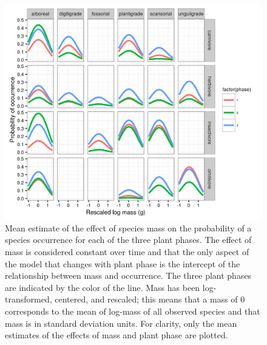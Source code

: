 \begin{figure}[ht]
  \centering
  \includegraphics[width=\textwidth,height=0.4\textheight,keepaspectratio=true]{chapter_coping/figure/mass_on_pres}
  \caption[Effect of mass on probability of species occurrence as estimated from the pure-presence model]{Mean estimate of the effect of species mass on the probability of a species occurrence for each of the three plant phases. The effect of mass is considered constant over time and that the only aspect of the model that changes with plant phase is the intercept of the relationship between mass and occurrence. The three plant phases are indicated by the color of the line. Mass has been log-transformed, centered, and rescaled; this means that a mass of 0 corresponds to the mean of log-mass of all observed species and that mass is in standard deviation units. For clarity, only the mean estimates of the effects of mass and plant phase are plotted.}
  \label{fig:mass_occur}
\end{figure}

